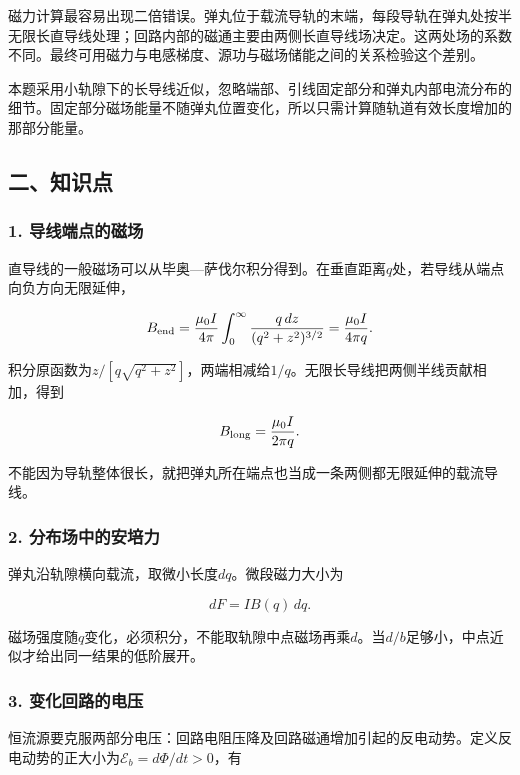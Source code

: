 \documentclass[12pt,a4paper,fontset=fandol]{ctexart}
\begin{document}
磁力计算最容易出现二倍错误。弹丸位于载流导轨的末端，每段导轨在弹丸处按半无限长直导线处理；回路内部的磁通主要由两侧长直导线场决定。这两处场的系数不同。最终可用磁力与电感梯度、源功与磁场储能之间的关系检验这个差别。

本题采用小轨隙下的长导线近似，忽略端部、引线固定部分和弹丸内部电流分布的细节。固定部分磁场能量不随弹丸位置变化，所以只需计算随轨道有效长度增加的那部分能量。

\subsection{二、知识点}\label{ux4e8cux77e5ux8bc6ux70b9-2}

\subsubsection{1.
导线端点的磁场}\label{ux5bfcux7ebfux7aefux70b9ux7684ux78c1ux573a}

直导线的一般磁场可以从毕奥---萨伐尔积分得到。在垂直距离\(q\)处，若导线从端点向负方向无限延伸，

\[
B_{\rm end}
=\frac{\mu_0I}{4\pi}
\int_0^\infty\frac{q\,dz}{(q^2+z^2)^{3/2}}
=\frac{\mu_0I}{4\pi q}.
\]

积分原函数为\(z/[q\sqrt{q^2+z^2}]\)，两端相减给\(1/q\)。无限长导线把两侧半线贡献相加，得到

\[
B_{\rm long}=\frac{\mu_0I}{2\pi q}.
\]

不能因为导轨整体很长，就把弹丸所在端点也当成一条两侧都无限延伸的载流导线。

\subsubsection{2.
分布场中的安培力}\label{ux5206ux5e03ux573aux4e2dux7684ux5b89ux57f9ux529b}

弹丸沿轨隙横向载流，取微小长度\(dq\)。微段磁力大小为

\[
dF=I B(q)\,dq.
\]

磁场强度随\(q\)变化，必须积分，不能取轨隙中点磁场再乘\(d\)。当\(d/b\)足够小，中点近似才给出同一结果的低阶展开。

\subsubsection{3.
变化回路的电压}\label{ux53d8ux5316ux56deux8defux7684ux7535ux538b}

恒流源要克服两部分电压：回路电阻压降及回路磁通增加引起的反电动势。定义反电动势的正大小为\(\mathcal E_b=d\Phi/dt>0\)，有
\end{document}
